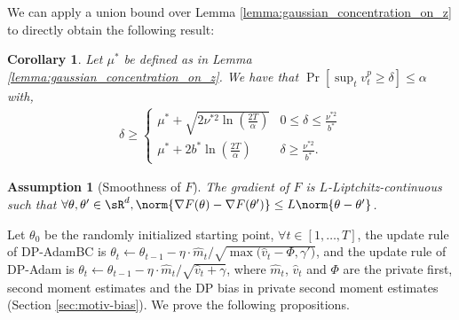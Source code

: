 \documentclass[letterpaper]{article} %
\newtheorem{assumption}{Assumption}
\newtheorem{lemma}[theorem]{Lemma}
\newtheorem{corollary}{Corollary}
\begin{document}
We can apply a union bound over Lemma \ref{lemma:gaussian_concentration_on_z} to directly obtain the following result:
\begin{corollary}
\label{lemma:union_bound_on_v}
    Let $\mu^{*}$ be defined as in Lemma \ref{lemma:gaussian_concentration_on_z}. We have that $\Pr[\sup_t v_t^p \geq \delta] \leq \alpha$ with,
    \begin{align*}
        \delta \geq
        \begin{cases}
            \mu^{*} + \sqrt{2\nu^{*2}\ln{(\frac{2T}{\alpha})}}
            & 0 \leq \delta  \leq \frac{\nu^{*2}}{b^{*}} \\
            \mu^{*} + 2b^{*}\ln{(\frac{2T}{\alpha})}
            & \delta   \geq \frac{\nu^{*2}}{b^{*}}.
        \end{cases}
    \end{align*}
\end{corollary}



\begin{assumption}[Smoothness of $F$]
\label{assmption:f_smooth}
The gradient of $F$ is $L$-Liptchitz-continuous such that $\forall \theta, \theta' \in \sR^{d}, \norm{\nabla F(\theta) - \nabla F(\theta')} \leq L \norm{\theta - \theta'}$.
\end{assumption}

Let $\theta_0$ be the randomly initialized starting point, $\forall t \in [1, \ldots, T]$, the update rule of DP-AdamBC is $\theta_{t} \leftarrow \theta_{t-1} - \eta \cdot \hat{m}_t / \sqrt{\max{\big(\hat{v}_t - \Phi}, \gamma' \big)}$, and the update rule of DP-Adam is $\theta_{t} \leftarrow \theta_{t-1} - \eta \cdot \hat{m}_t / \sqrt{\hat{v}_t + \gamma}$, where $\hat{m}_t$, $\hat{v}_t$ and $\Phi$ are the private first, second moment estimates and the DP bias in private second moment estimates (Section \ref{sec:motiv-bias}). We prove the following propositions.
\end{document}
